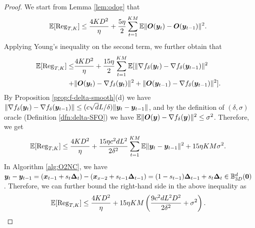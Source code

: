 \begin{proof}
	We start from Lemma \ref{lem:odog} that
	\begin{align*}
		\mathbb{E} [{\rm Reg}_{T,K}] \le \frac{4 K D^2}{\eta} + \frac{5 \eta}{2} \sum_{t=1}^{KM} \mathbb{E} \Vert {\bm{O}}({\bm{y}}_t) - {\bm{O}}({\bm{y}}_{t-1}) \Vert^2.
	\end{align*}
	Applying Young's inequality on the second term, we further obtain that
	\begin{align*}
		\mathbb{E} [{\rm Reg}_{T,K}] \le& \frac{4 K D^2}{\eta} + \frac{15 \eta}{2} \sum_{t=1}^{KM} \mathbb{E} [\Vert \nabla f_\delta({\bm{y}}_t) - \nabla f_\delta({\bm{y}}_{t-1}) \Vert^2 \\
		+ &\Vert {\bm{O}}({\bm{y}}_t) - \nabla f_\delta({\bm{y}}_t) \Vert^2 + \Vert {\bm{O}}({\bm{y}}_{t-1}) - \nabla f_\delta({\bm{y}}_{t-1}) \Vert^2].
	\end{align*}
	By Proposition \ref{prop:f-delta-smooth}(d) we have $\Vert \nabla f_\delta({\bm{y}}_t) - \nabla f_\delta({\bm{y}}_{t-1}) \Vert \le (c \sqrt{d} L /\delta) \Vert {\bm{y}}_t - {\bm{y}}_{t-1} \Vert$, and by the definition of $(\delta,\sigma)$ oracle (Definition \ref{dfn:delta-SFO}) we have $\mathbb{E} \Vert {\bm{O}}({\bm{y}}) - \nabla f_\delta({\bm{y}}) \Vert^2 \le \sigma^2 $. Therefore, we get
	\begin{align*}
		\mathbb{E} [{\rm Reg}_{T,K}] \le \frac{4 K D^2}{\eta} + \frac{15 \eta c^2 d L^2 }{2\delta^2}  \sum_{t=1}^{KM} \mathbb{E} \Vert {\bm{y}}_t - {\bm{y}}_{t-1} \Vert^2  + 15 \eta KM \sigma^2.
	\end{align*}
	In Algorithm \ref{alg:O2NC}, we have ${\bm{y}}_t - {\bm{y}}_{t-1} = ({\bm{x}}_{t-1} + s_t {\bm{\Delta}}_t) - ({\bm{x}}_{x-2} + s_{t-1} {\bm{\Delta}}_{t-1}) = (1- s_{t-1}) {\bm{\Delta}}_{t-1} + s_t {\bm{\Delta}}_t \in {\mathbb{B}}_{3D}^d({\bm{0}}) $. Therefore, we can further bound the right-hand side in the above inequality as
	\begin{align*}
		\mathbb{E}[{\rm Reg}_{T,K}] \le \frac{4 K D^2}{\eta} + 15 \eta KM \left( \frac{9 c^2 d L^2 D^2}{2 \delta^2} + \sigma^2 \right).
	\end{align*}
\end{proof}

